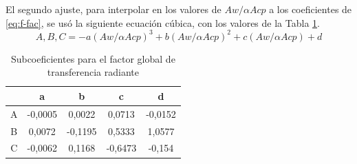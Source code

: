 \par El segundo ajuste, para interpolar en los valores de $Aw/\alpha Acp$ a los coeficientes de \ref{eq:f-fac}, se usó la siguiente ecuación cúbica, con los valores de la Tabla \ref{tbl:aw-fac}.
\begin{equation}
\label{eq:aw-fac}
A, B, C = -a(Aw/\alpha Acp)^3+b(Aw/\alpha Acp)^2+c(Aw/\alpha Acp)+d
\end{equation}
\begin{table}[H]
\caption{Subcoeficientes para el factor global de transferencia radiante}
\label{tbl:aw-fac}
\centering
\begin{tabular}{c|c|c|c|c}
    &	a	    & b         & c         &d      \\
    \hline
A	& -0,0005	& 0,0022	&0,0713	    &-0,0152\\
B	& 0,0072 	& -0,1195	&0,5333	    &1,0577 \\
C	& -0,0062   & 0,1168	&-0,6473	&-0,154 \\
\end{tabular}
\end{table}


